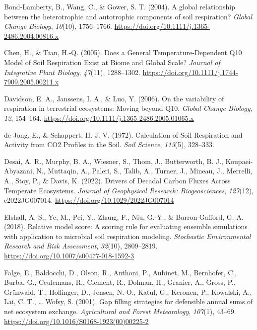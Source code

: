 \documentclass[
  letterpaper,
  DIV=11,
  numbers=noendperiod]{scrartcl}
\newlength{\cslhangindent}
\newenvironment{CSLReferences}[2] %
 {\begin{list}{}{%
  \setlength{\itemindent}{0pt}
  \setlength{\leftmargin}{0pt}
  \setlength{\parsep}{0pt}
  \ifodd #1
   \setlength{\leftmargin}{\cslhangindent}
   \setlength{\itemindent}{-1\cslhangindent}
  \fi
  \setlength{\itemsep}{#2\baselineskip}}}
 {\end{list}}
\begin{document}
\begin{CSLReferences}{1}{0}
Bond-Lamberty, B., Wang, C., \& Gower, S. T. (2004). A global
relationship between the heterotrophic and autotrophic components of
soil respiration? \emph{Global Change Biology}, \emph{10}(10),
1756--1766. \url{https://doi.org/10.1111/j.1365-2486.2004.00816.x}

Chen, H., \& Tian, H.-Q. (2005). Does a {General Temperature-Dependent
Q10 Model} of {Soil Respiration Exist} at {Biome} and {Global Scale}?
\emph{Journal of Integrative Plant Biology}, \emph{47}(11), 1288--1302.
\url{https://doi.org/10.1111/j.1744-7909.2005.00211.x}

Davidson, E. A., Janssens, I. A., \& Luo, Y. (2006). On the variability
of respiration in terrestrial ecosystems: Moving beyond {Q10}.
\emph{Global Change Biology}, \emph{12}, 154--164.
\url{https://doi.org/10.1111/j.1365-2486.2005.01065.x}

de Jong, E., \& Schappert, H. J. V. (1972). Calculation of {Soil
Respiration} and {Activity} from {CO2 Profiles} in the {Soil}.
\emph{Soil Science}, \emph{113}(5), 328--333.

Desai, A. R., Murphy, B. A., Wiesner, S., Thom, J., Butterworth, B. J.,
Koupaei-Abyazani, N., Muttaqin, A., Paleri, S., Talib, A., Turner, J.,
Mineau, J., Merrelli, A., Stoy, P., \& Davis, K. (2022). Drivers of
{Decadal Carbon Fluxes Across Temperate Ecosystems}. \emph{Journal of
Geophysical Research: Biogeosciences}, \emph{127}(12), e2022JG007014.
\url{https://doi.org/10.1029/2022JG007014}

Elshall, A. S., Ye, M., Pei, Y., Zhang, F., Niu, G.-Y., \&
Barron-Gafford, G. A. (2018). Relative model score: A scoring rule for
evaluating ensemble simulations with application to microbial soil
respiration modeling. \emph{Stochastic Environmental Research and Risk
Assessment}, \emph{32}(10), 2809--2819.
\url{https://doi.org/10.1007/s00477-018-1592-3}

Falge, E., Baldocchi, D., Olson, R., Anthoni, P., Aubinet, M.,
Bernhofer, C., Burba, G., Ceulemans, R., Clement, R., Dolman, H.,
Granier, A., Gross, P., Grünwald, T., Hollinger, D., Jensen, N.-O.,
Katul, G., Keronen, P., Kowalski, A., Lai, C. T., \ldots{} Wofsy, S.
(2001). Gap filling strategies for defensible annual sums of net
ecosystem exchange. \emph{Agricultural and Forest Meteorology},
\emph{107}(1), 43--69.
\url{https://doi.org/10.1016/S0168-1923(00)00225-2}


\end{CSLReferences}
\end{document}
